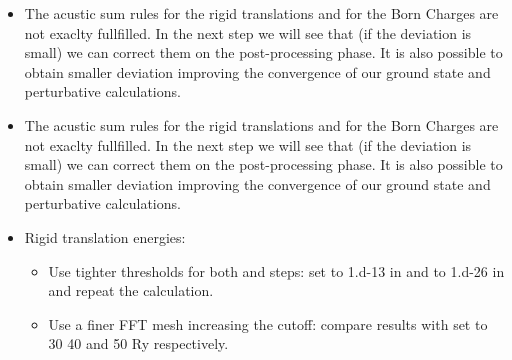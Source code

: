 \documentclass[landscape]{foils}
\begin{document}
\begin{itemize}
\item The acustic sum rules for the rigid translations and for the Born Charges are not exaclty fullfilled. In the  next step we will see that 
	(if the deviation is small) we can correct them on the post-processing phase. It is also possible to obtain smaller deviation improving 
		the convergence of our ground state and perturbative calculations. 
\end{itemize}
\begin{itemize}
\item The acustic sum rules for the rigid translations and for the Born Charges are not exaclty fullfilled. In the  next step we will see that 
	(if the deviation is small) we can correct them on the post-processing phase. It is also possible to obtain smaller deviation improving 
		the convergence of our ground state and perturbative calculations. 
	\item {Rigid translation energies:
	\begin{itemize}
		\item Use tighter thresholds for both  and  steps: set  to 1.d-13 
			in  and  to 1.d-26 
			in  and repeat the calculation. 
		\item Use a finer FFT mesh increasing the cutoff: compare results with  set to 30 40 and 50 Ry respectively.  
	\end{itemize}
		}
\end{itemize}
\end{document}
